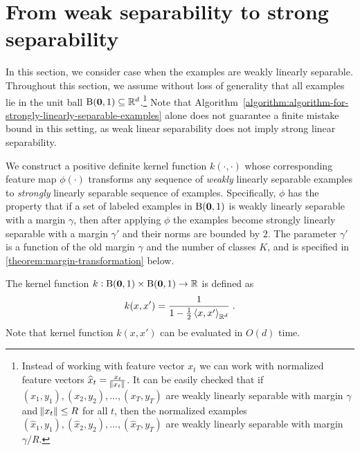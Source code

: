 \section{From weak separability to strong separability}
\label{section:from-weak-separability-to-strong-separability}

In this section, we consider case when the examples are weakly linearly
separable. Throughout this section, we assume without loss of generality that
all examples lie in the unit ball $\operatorname{B}(\mathbf{0},1) \subseteq \mathbb{R}^d$.\footnote{Instead of
working with feature vector $x_t$ we can work with normalized feature vectors
$\widehat{x}_t = \frac{x_t}{\norm{x_t}}$. It can be easily checked that if
$(x_1,y_1), (x_2,y_2), \dots, (x_T,y_T)$ are weakly linearly separable with
margin $\gamma$ and $\norm{x_t} \le R$ for all $t$, then the normalized examples
$(\widehat{x}_1,y_1), (\widehat{x}_2,y_2), \dots, (\widehat{x}_T,y_T)$ are weakly
linearly separable with margin $\gamma/R$.} Note that
Algorithm~\ref{algorithm:algorithm-for-strongly-linearly-separable-examples}
alone does not guarantee a finite mistake bound in this setting, as weak linear
separability does not imply strong linear separability.

We construct a positive definite kernel function $k(\cdot, \cdot)$ whose
corresponding feature map $\phi(\cdot)$ transforms any sequence of \emph{weakly}
linearly separable examples to \emph{strongly} linearly separable sequence of
examples. Specifically, $\phi$ has the property that if a set of labeled
examples in $\operatorname{B}(\mathbf{0},1)$ is weakly linearly separable with a margin $\gamma$, then
after applying $\phi$ the examples become strongly linearly separable with a
margin $\gamma'$ and their norms are bounded by $2$. The parameter $\gamma'$ is
a function of the old margin $\gamma$ and the number of classes $K$, and is
specified in \autoref{theorem:margin-transformation} below.

The kernel function $k:\operatorname{B}(\mathbf{0},1) \times \operatorname{B}(\mathbf{0},1) \to \mathbb{R}$ is defined as
$$
k(x,x') = \frac{1}{1 - \frac{1}{2}\left\langle x, x' \right\rangle_{\mathbb{R}^d}} \; .
$$
Note that kernel function $k(x,x')$ can be evaluated in $O(d)$ time.

